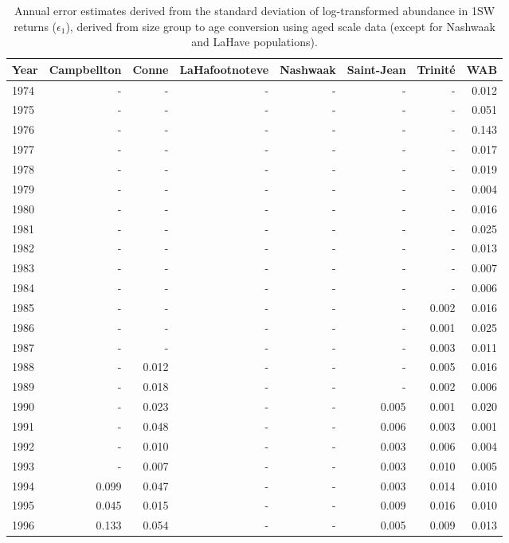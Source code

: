 \begingroup\footnotesize
\begin{longtable}{lrrrrrrr}
\caption{Annual error estimates derived from the standard deviation of log-transformed abundance 
                    in 1SW returns ($\epsilon_{1}$), derived from size group to age conversion using aged scale data 
                    (except for Nashwaak and LaHave populations).} \\ 
  \hline
Year & Campbellton & Conne & LaHafootnoteve & Nashwaak & Saint-Jean & Trinité & WAB \\ 
  \hline
1974 & - & - & - & - & - & - & 0.012 \\ 
  1975 & - & - & - & - & - & - & 0.051 \\ 
  1976 & - & - & - & - & - & - & 0.143 \\ 
  1977 & - & - & - & - & - & - & 0.017 \\ 
  1978 & - & - & - & - & - & - & 0.019 \\ 
  1979 & - & - & - & - & - & - & 0.004 \\ 
  1980 & - & - & - & - & - & - & 0.016 \\ 
  1981 & - & - & - & - & - & - & 0.025 \\ 
  1982 & - & - & - & - & - & - & 0.013 \\ 
  1983 & - & - & - & - & - & - & 0.007 \\ 
  1984 & - & - & - & - & - & - & 0.006 \\ 
  1985 & - & - & - & - & - & 0.002 & 0.016 \\ 
  1986 & - & - & - & - & - & 0.001 & 0.025 \\ 
  1987 & - & - & - & - & - & 0.003 & 0.011 \\ 
  1988 & - & 0.012 & - & - & - & 0.005 & 0.016 \\ 
  1989 & - & 0.018 & - & - & - & 0.002 & 0.006 \\ 
  1990 & - & 0.023 & - & - & 0.005 & 0.001 & 0.020 \\ 
  1991 & - & 0.048 & - & - & 0.006 & 0.003 & 0.001 \\ 
  1992 & - & 0.010 & - & - & 0.003 & 0.006 & 0.004 \\ 
  1993 & - & 0.007 & - & - & 0.003 & 0.010 & 0.005 \\ 
  1994 & 0.099 & 0.047 & - & - & 0.003 & 0.014 & 0.010 \\ 
  1995 & 0.045 & 0.015 & - & - & 0.009 & 0.016 & 0.010 \\ 
  1996 & 0.133 & 0.054 & - & - & 0.005 & 0.009 & 0.013 \\ 

\end{longtable}
